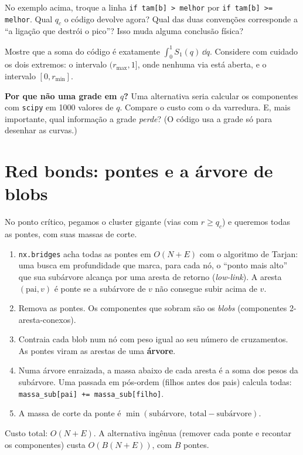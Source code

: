 \documentclass[11pt]{article}
\begin{document}
 No exemplo acima, troque a linha \texttt{if tam[b] > melhor} por \texttt{if tam[b] >= melhor}. Qual $q_c$ o código devolve agora? Qual das duas convenções corresponde a ``a ligação que destrói o pico''? Isso muda alguma conclusão física?

 Mostre que a soma do código é exatamente $\int_0^1S_1(q)\,\dd q$. Considere com cuidado os dois extremos: o intervalo $(r_{\max},1]$, onde nenhuma via está aberta, e o intervalo $[0,r_{\min}]$.

 \textbf{Por que não uma grade em $q$?} Uma alternativa seria calcular os componentes com \texttt{scipy} em 1000 valores de $q$. Compare o custo com o da varredura. E, mais importante, qual informação a grade \emph{perde}? (O código usa a grade só para desenhar as curvas.)

\section{Red bonds: pontes e a árvore de blobs}

No ponto crítico, pegamos o cluster gigante (vias com $r\ge q_c$) e queremos todas as pontes, com suas massas de corte.

\begin{ideia}
\begin{enumerate}
  \item \texttt{nx.bridges} acha todas as pontes em $O(N+E)$ com o algoritmo de Tarjan: uma busca em profundidade que marca, para cada nó, o ``ponto mais alto'' que sua subárvore alcança por uma aresta de retorno (\emph{low-link}). A aresta $(\text{pai},v)$ é ponte se a subárvore de $v$ não consegue subir acima de $v$.
  \item Remova as pontes. Os componentes que sobram são os \emph{blobs} (componentes 2-aresta-conexos).
  \item Contraia cada blob num nó com peso igual ao seu número de cruzamentos. As pontes viram as arestas de uma \textbf{árvore}.
  \item Numa árvore enraizada, a massa abaixo de cada aresta é a soma dos pesos da subárvore. Uma passada em pós-ordem (filhos antes dos pais) calcula todas: \texttt{massa\_sub[pai] += massa\_sub[filho]}.
  \item A massa de corte da ponte é $\min(\text{subárvore},\ \text{total}-\text{subárvore})$.
\end{enumerate}
Custo total: $O(N+E)$. A alternativa ingênua (remover cada ponte e recontar os componentes) custa $O(B(N+E))$, com $B$ pontes.
\end{ideia}
\end{document}
